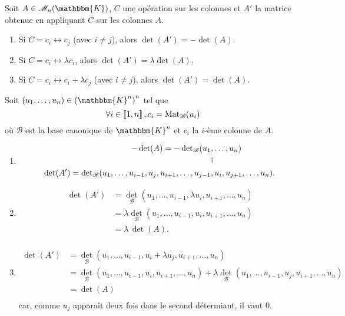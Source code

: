\begin{prop}
	Soit $A \in \mathcal{M}_n(\mathbbm{K})$, $C$ une opération sur les colonnes et $A'$ la matrice obtenue en appliquant $C$ sur les colonnes $A$.

	\begin{enumerate}
		\item Si $C = c_i \longleftrightarrow c_j$ (avec $i\neq j$), alors $\det(A') = -\det(A)$.
		\item Si $C = c_i \longleftrightarrow \lambda c_i$, alors $\det(A') = \lambda \det(A)$.
		\item Si $C = c_i \longleftrightarrow c_i + \lambda c_j$ (avec $i \neq j$), alors $\det(A') = \det(A)$.
	\end{enumerate}
\end{prop}

\begin{prv}
	Soit $(u_1, \ldots, u_n) \in \left(\mathbbm{K}^n\right)^n$ tel que \[
		\forall i \in \left\llbracket 1,n \right\rrbracket, c_i = \operatorname{Mat}_\mathcal{B}(u_i)
	\] où $\mathcal{B}$ est la base canonique de $\mathbbm{K}^n$ et $c_i$ la $i$-ème colonne de $A$.

	\begin{enumerate}
		\item
			\begin{align*}
				-\det(A) = -\det_{\mathcal{B}}(u_1&, \ldots, u_n)\\
				&\vrt=\\
				\det(A') = \det_{\mathcal{B}}(u_1, \ldots, u_{i-1}, u_j, u_{i+1}, \ldots, u_{j-1}&, u_i, u_{j+1}, \ldots, u_n).
			\end{align*}
		\item
			\begin{align*}
				\det(A') &= \det_\mathcal{B}(u_1, \ldots, u_{i-1}, \lambda u_i, u_{i+1}, \ldots, u_n) \\
				&= \lambda \det_\mathcal{B}(u_1, \ldots, u_{i-1}, u_i, u_{i+1}, \ldots, u_n) \\
				&= \lambda\,\det(A). \\
			\end{align*}
		\item
			\begin{align*}
				\det(A') &= \det_\mathcal{B}(u_1, \ldots, u_{i-1}, u_i + \lambda u_j, u_{i+1}, \ldots, u_n) \\
				&= \det_\mathcal{B}(u_1, \ldots, u_{i-1}, u_i, u_{i+1}, \ldots, u_n) + \lambda \det_\mathcal{B}(u_1, \ldots, u_{i-1}, u_j, u_{i+1}, \ldots, u_n) \\
				&= \det(A) \\
			\end{align*}
			car, comme $u_j$ apparaît deux fois dans le second détermiant, il vaut $0$.
	\end{enumerate}
\end{prv}

